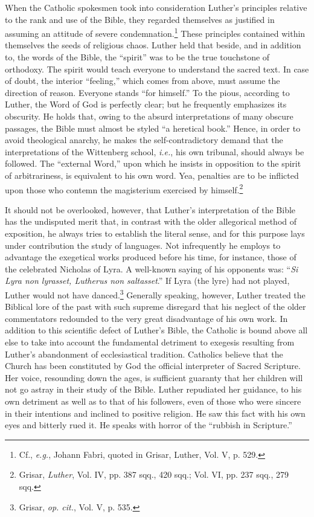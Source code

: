 When the Catholic spokesmen took into consideration Luther’s
principles relative to the rank and use of the Bible, they regarded
themselves as justified in assuming an attitude of severe condemnation.\footnote
{Cf., \textit{e.g.}, Johann Fabri, quoted in Grisar, Luther, Vol. V, p. 529.}
These principles contained within themselves the seeds of religious
chaos. Luther held that beside, and in addition to, the words
of the Bible, the “spirit” was to be the true touchstone of orthodoxy.
The spirit would teach everyone to understand the sacred text. In case
of doubt, the interior “feeling,” which comes from above, must
assume the direction of reason. Everyone stands “for himself.” To the
pious, according to Luther, the Word of God is perfectly clear; but
he frequently emphasizes its obscurity. He holds that, owing to the
absurd interpretations of many obscure passages, the Bible must almost
be styled “a heretical book.” Hence, in order to avoid theological
anarchy, he makes the self-contradictory demand that the interpretations
of the Wittenberg school, \textit{i.e.}, his own tribunal, should always
be followed. The “external Word,” upon which he insists in opposition
to the spirit of arbitrariness, is equivalent to his own word. Yea,
penalties are to be inflicted upon those who contemn the magisterium
exercised by himself.\footnote
{Grisar, \textit{Luther}, Vol. IV, pp. 387 sqq., 420 sqq.; Vol. VI, pp. 237 sqq., 279 sqq.}

It should not be overlooked, however, that Luther’s interpretation
of the Bible has the undisputed merit that, in contrast with the older
allegorical method of exposition, he always tries to establish the literal
sense, and for this purpose lays under contribution the study of languages.
Not infrequently he employs to advantage the exegetical
works produced before his time, for instance, those of the celebrated
Nicholas of Lyra. A well-known saying of his opponents was: “\textit{Si
Lyra non lyrasset, Lutherus non saltasset}.” If Lyra (the lyre) had
not played, Luther would not have danced.\footnote{Grisar, \textit{op. cit.}, Vol. V, p. 535.}
 Generally speaking,
however, Luther treated the Biblical lore of the past with such supreme
disregard that his neglect of the older commentators redounded to the
very great disadvantage of his own work. In addition to this scientific
defect of Luther’s Bible, the Catholic is bound above all else to
take into account the fundamental detriment to exegesis resulting from
Luther’s abandonment of ecclesiastical tradition. Catholics believe
that the Church has been constituted by God the official interpreter
of Sacred Scripture. Her voice, resounding down the ages, is sufficient
guaranty that her children will not go astray in their study of the
Bible. Luther repudiated her guidance, to his own detriment as well
as to that of his followers, even of those who were sincere in their intentions
and inclined to positive religion. He saw this fact with his
own eyes and bitterly rued it. He speaks with horror of the “rubbish
in Scripture.”

